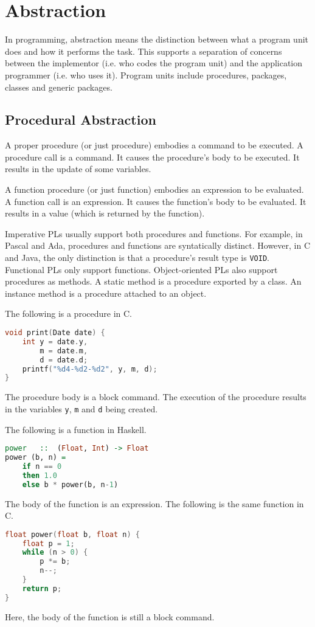 \documentclass[a4paper, openany]{memoir}
\begin{document}
\section{Abstraction}
In programming, abstraction means the distinction between what a program unit does and how it performs the task. This supports a separation of concerns between the implementor (i.e. who codes the program unit) and the application programmer (i.e. who uses it). Program units include procedures, packages, classes and generic packages.

\subsection{Procedural Abstraction}
A proper procedure (or just procedure) embodies a command to be executed. A procedure call is a command. It causes the procedure's body to be executed. It results in the update of some variables.

A function procedure (or just function) embodies an expression to be evaluated. A function call is an expression. It causes the function's body to be evaluated. It results in a value (which is returned by the function).

Imperative PLs usually support both procedures and functions. For example, in Pascal and Ada, procedures and functions are syntatically distinct. However, in C and Java, the only distinction is that a procedure's result type is \texttt{VOID}. Functional PLs only support functions. Object-oriented PLs also support procedures as methods. A static method is a procedure exported by a class. An instance method is a procedure attached to an object.

The following is a procedure in C.
\begin{lstlisting}[language=C]
void print(Date date) {
    int y = date.y,
        m = date.m,
        d = date.d;
    printf("%d4-%d2-%d2", y, m, d);
}
\end{lstlisting}
The procedure body is a block command. The execution of the procedure results in the variables \texttt{y}, \texttt{m} and \texttt{d} being created.

The following is a function in Haskell.
\begin{lstlisting}[language=Haskell]
power   ::  (Float, Int) -> Float
power (b, n) =
    if n == 0
    then 1.0
    else b * power(b, n-1)
\end{lstlisting}
The body of the function is an expression. The following is the same function in C.
\begin{lstlisting}[language=C]
float power(float b, float n) {
    float p = 1;
    while (n > 0) {
        p *= b;
        n--;
    }
    return p;
}
\end{lstlisting}
Here, the body of the function is still a block command.
\end{document}
